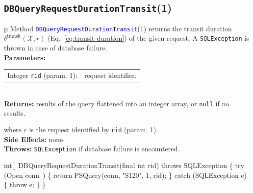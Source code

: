 \subsection{\texttt{DBQueryRequestDurationTransit}(1)}
\begin{tabular}{p{\textwidth}}
\toprule
{}
Method \textcolor{blue}{{\tt{}\protect{}DBQueryRequestDurationTransit}}(1) returns the
transit duration $\delta^\textrm{transit}(\mathcal{X},r)$
(Eq.~\ref{eq:transit-duration}) of the given request.
A {\tt{}SQLException} is thrown in case of database failure.\\
\midrule
\textbf{Parameters:}\\
\begin{tabular}{lp{116mm}}
Integer {\tt{}rid} (param. 1):&request identifier.
\end{tabular}\\
\textbf{Returns:} results of the query flattened into an integer array,
or {\tt{}null} if no results.


where $r$ is the request identified by {\tt{}rid} (param. 1).\\
\textbf{Side Effects:} none.\\
\textbf{Throws:} {\tt{}SQLException} if database failure is encountered.\\
\bottomrule
\end{tabular}
\nwenddocs{}\endmoddef{}
int[] DBQueryRequestDurationTransit(final int rid) throws SQLException \{
  try (\LA{}Open \code{}conn\edoc{}~{\nwtagstyle{}}\RA{}) \{
    return PSQuery(conn, "S120", 1, rid);
  \} catch (SQLException e) \{
    throw e;
  \}
\}
\eatline
{}\nwendcode{}\nwdocspar
